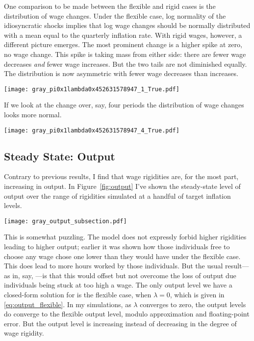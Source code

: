 \documentclass[12pt,a4paper]{scrartcl}            %
\begin{document}
One comparison to be made between the flexible and rigid cases is the distribution of wage changes.
Under the flexible case, log normality of the idiosyncratic shocks implies that log wage changes should be normally distributed with a mean equal to the quarterly inflation rate.
With rigid wages, however, a different picture emerges.
The most prominent change is a higher spike at zero, no wage change.
This spike is taking mass from either side: there are fewer wage decreases \emph{and} fewer wage increases.
But the two tails are not diminished equally.
The distribution is now asymmetric with fewer wage decreases than increases.
\begin{center}
  \texttt{[image: gray\_pi0x1lambda0x452631578947\_1\_True.pdf]}
  \label{fig:dist_1_periods}
\end{center}

If we look at the change over, say, four periods the distribution of wage changes looks more normal.

\begin{center}
  \texttt{[image: gray\_pi0x1lambda0x452631578947\_4\_True.pdf]}
  \label{fig:dist_4_periods}
\end{center}


\subsection{Steady State: Output}
\label{sub:steady_state_output}

Contrary to previous results, I find that wage rigidities are, for the most part, increasing in output.
In Figure~\ref{fig:output} I've shown the steady-state level of output over the range of rigidities simulated at a handful of target inflation levels.

\begin{center}
  \texttt{[image: gray\_output\_subsection.pdf]}
  \label{fig:output}
\end{center}

This is somewhat puzzling.
The model does not expressly forbid higher rigidities leading to higher output;
earlier it was shown how those individuals free to choose any wage chose one lower than they would have under the flexible case.
This does lead to more hours worked by those individuals.
But the usual result---as in, say, \cite{daly_hobijn_2013}---is that this would offset but not overcome the loss of output due individuals being stuck at too high a wage.
The only output level we have a closed-form solution for is the flexible case, when $\lambda = 0$, which is given in \eqref{eq:output_flexible}.
In my simulations, as $\lambda$ converges to zero, the output levels do converge to the flexible output level, modulo approximation and floating-point error.
But the output level is increasing instead of decreasing in the degree of wage rigidity.
\end{document}
